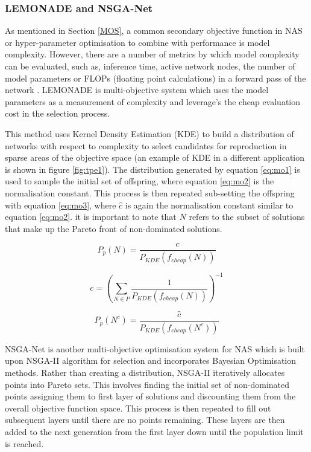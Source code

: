 \documentclass{article}
\begin{document}
		\subsubsection{LEMONADE and NSGA-Net}		

			As mentioned in Section \ref{MOS}, a common secondary objective function in NAS or hyper-parameter optimisation to combine with performance is model complexity. However, there are a number of metrics by which model complexity can be evaluated, such as, inference time, active network nodes, the number of model parameters or FLOPs (floating point calculations) in a forward pass of the network \cite{5}. 
			LEMONADE \cite{13} is multi-objective system which uses the model parameters as a measurement of complexity and leverage's the cheap evaluation cost in the selection process.

			This method uses Kernel Density Estimation (KDE) to build a distribution of networks with respect to complexity to select candidates for reproduction in sparse areas of the objective space (an example of KDE in a different application is shown in figure \ref{fig:tpe1}). The distribution generated by equation \ref{eq:mo1} is used to sample the initial set of offspring, where equation \ref{eq:mo2} is the normalisation constant. This process is then repeated sub-setting the offspring with equation \ref{eq:mo3}, where \(\hat{c}\) is again the normalisation constant similar to equation \ref{eq:mo2}. it is important to note that \(N\) refers to the subset of solutions that make up the Pareto front of non-dominated solutions.

			\begin{equation}\label{eq:mo1}
				P_p(N) = \frac{c}{P_{KDE}(f_{cheap}(N))}
			\end{equation}

			\begin{equation}\label{eq:mo2}
				c = \left(\sum_{N\in P}\frac{1}{P_{KDE}(f_{cheap}(N))}\right)^{-1}
			\end{equation}

			\begin{equation}\label{eq:mo3}
				P_p(N^c) = \frac{\hat{c}}{P_{KDE}(f_{cheap}(N^c))}
			\end{equation}


			NSGA-Net \cite{5} is another multi-objective optimisation system for NAS which is built upon NSGA-II algorithm\cite{42} for selection and incorporates Bayesian Optimisation methods. Rather than creating a distribution, NSGA-II iteratively allocates points into Pareto sets. This involves finding the initial set of non-dominated points assigning them to first layer of solutions and discounting them from the overall objective function space. This process is then repeated to fill out subsequent layers until there are no points remaining. These layers are then added to the next generation from the first layer down until the population limit is reached. 
\end{document}
